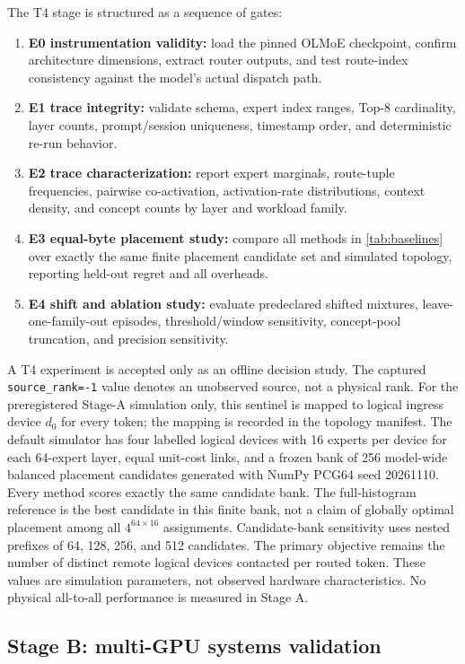 \documentclass[a4paper,preprint,review,12pt,authoryear]{elsarticle}
\begin{document}
The T4 stage is structured as a sequence of gates:
\begin{enumerate}[leftmargin=*]
  \item \textbf{E0 instrumentation validity:} load the pinned OLMoE checkpoint, confirm architecture dimensions, extract router outputs, and test route-index consistency against the model's actual dispatch path.
  \item \textbf{E1 trace integrity:} validate schema, expert index ranges, Top-8 cardinality, layer counts, prompt/session uniqueness, timestamp order, and deterministic re-run behavior.
  \item \textbf{E2 trace characterization:} report expert marginals, route-tuple frequencies, pairwise co-activation, activation-rate distributions, context density, and concept counts by layer and workload family.
  \item \textbf{E3 equal-byte placement study:} compare all methods in \cref{tab:baselines} over exactly the same finite placement candidate set and simulated topology, reporting held-out regret and all overheads.
  \item \textbf{E4 shift and ablation study:} evaluate predeclared shifted mixtures, leave-one-family-out episodes, threshold/window sensitivity, concept-pool truncation, and precision sensitivity.
\end{enumerate}

A T4 experiment is accepted only as an offline decision study. The captured \texttt{source\_rank=-1} value denotes an unobserved source, not a physical rank. For the preregistered Stage-A simulation only, this sentinel is mapped to logical ingress device $d_0$ for every token; the mapping is recorded in the topology manifest. The default simulator has four labelled logical devices with 16 experts per device for each 64-expert layer, equal unit-cost links, and a frozen bank of 256 model-wide balanced placement candidates generated with NumPy PCG64 seed 20261110. Every method scores exactly the same candidate bank. The full-histogram reference is the best candidate in this finite bank, not a claim of globally optimal placement among all $4^{64\times16}$ assignments. Candidate-bank sensitivity uses nested prefixes of 64, 128, 256, and 512 candidates. The primary objective remains the number of distinct remote logical devices contacted per routed token. These values are simulation parameters, not observed hardware characteristics. No physical all-to-all performance is measured in Stage A.

\subsection{Stage B: multi-GPU systems validation}
\end{document}

